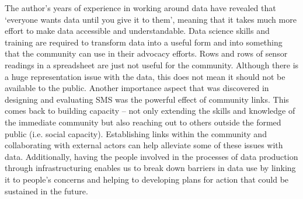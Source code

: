 The author's years of experience in working around data have revealed that `everyone wants data until you give it to them', meaning that it takes much more effort to make data accessible and understandable. Data science skills and training are required to transform data into a useful form and into something that the community can use in their advocacy efforts. Rows and rows of sensor readings in a spreadsheet are just not useful for the community. Although there is a huge representation issue with the data, this does not mean it should not be available to the public. Another importance aspect that was discovered in designing and evaluating SMS was the powerful effect of community links. This comes back to building capacity -- not only extending the skills and knowledge of the immediate community but also reaching out to others outside the formed public (i.e. social capacity). Establishing links within the community and collaborating with external actors can help alleviate some of these issues with data. Additionally, having the people involved in the processes of data production through infrastructuring enables us to break down barriers in data use by linking it to people's concerns and helping to developing plans for action that could be sustained in the future.

